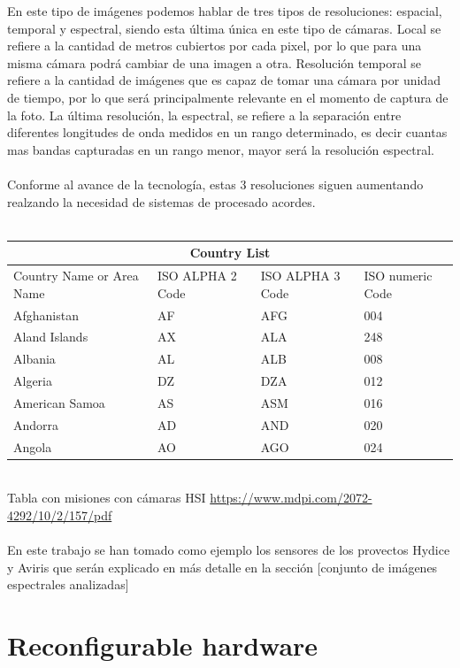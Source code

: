 \bigskip
En este tipo de imágenes podemos hablar de tres tipos de resoluciones: espacial, temporal y espectral, siendo esta última única en este tipo de cámaras. Local se refiere a la cantidad de metros cubiertos por cada pixel, por lo que para una misma cámara podrá cambiar de una imagen a otra. Resolución temporal se refiere a la cantidad de imágenes que es capaz de tomar una cámara por unidad de tiempo, por lo que será principalmente relevante en el momento de captura de la foto. La última resolución, la espectral, se refiere a la separación entre diferentes longitudes de onda medidos en un rango determinado, es decir cuantas mas bandas capturadas en un rango menor, mayor será la resolución espectral.
\\
\\
Conforme al avance de la tecnología, estas 3 resoluciones siguen aumentando realzando la necesidad de sistemas de procesado acordes.
\\
\\
\begin{tabular}{ |p{3cm}||p{3cm}|p{3cm}|p{3cm}|  }
 \hline
 \multicolumn{4}{|c|}{Country List} \\
 \hline
 Country Name     or Area Name& ISO ALPHA 2 Code &ISO ALPHA 3 Code&ISO numeric Code\\
 \hline
 Afghanistan   & AF    &AFG&   004\\
 Aland Islands&   AX  & ALA   &248\\
 Albania &AL & ALB&  008\\
 Algeria    &DZ & DZA&  012\\
 American Samoa&   AS  & ASM&016\\
 Andorra& AD  & AND   &020\\
 Angola& AO  & AGO&024\\
 \hline
\end{tabular}
\\
Tabla con misiones con cámaras HSI
\url{https://www.mdpi.com/2072-4292/10/2/157/pdf}
\\
\\
En este trabajo se han tomado como ejemplo los sensores de los provectos Hydice y Aviris que serán explicado en más detalle en la sección [conjunto de imágenes espectrales analizadas]


\section{Reconfigurable hardware}

